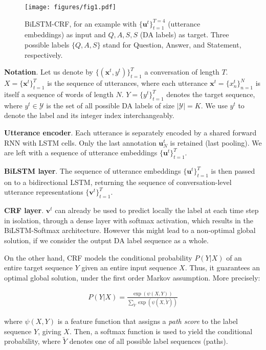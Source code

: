 \documentclass[11pt,a4paper]{article}
\begin{document}
\begin{figure}[t]
\centering
\texttt{[image: figures/fig1.pdf]}
\caption{
BiLSTM-CRF, for an example with $\{\mathbf{u}^t\}_{t=1}^{T=4}$ (utterance embeddings) as input and $Q,A,S,S$ (DA labels) as target. Three possible labels $\{Q,A,S\}$ stand for Question, Answer, and Statement, respectively.
}
\label{fig:BiLSTM-CRF}
\end{figure}

\noindent\textbf{Notation}.
Let us denote by $\{(\mathbf{x}^t, y^t)\}_{t=1}^{T}$ a conversation of length $T$.  $X=\{\mathbf{x}^t\}_{t=1}^{T}$ is the sequence of utterances, where each utterance $\mathbf{x}^t=\{x_n^t\}_{n=1}^N$ is itself a sequence of words of length $N$.
$Y=\{y^t\}_{t=1}^{T}$ denotes the target sequence, where $y^t \in \mathcal{Y}$ is the set of all possible DA labels of size $|\mathcal{Y}|=K$.
We use $y^t$ to denote the label and its integer index interchangeably.

\noindent\textbf{Utterance encoder}.
Each utterance is separately encoded by a shared forward RNN with LSTM cells.
Only the last annotation $\mathbf{u}^t_N$ is retained (last pooling).
We are left with a sequence of utterance embeddings $\{\mathbf{u}^t\}_{t=1}^T$.


\noindent\textbf{BiLSTM layer}. 
The sequence of utterance embeddings $\{\mathbf{u}^t\}_{t=1}^T$ is then passed on to a bidirectional LSTM, returning the sequence of conversation-level utterance representations $\{\mathbf{v}^t\}_{t=1}^T$.

\noindent\textbf{CRF layer}.
$\mathbf{v}^t$ can already be used to predict locally the label at each time step in isolation, through a dense layer with softmax activation, which results in the BiLSTM-Softmax architecture.
However this might lead to a non-optimal global solution, if we consider the output DA label sequence as a whole.

On the other hand, CRF models the conditional probability $P(Y|X)$ of an entire target sequence $Y$ given an entire input sequence $X$.
Thus, it guarantees an optimal global solution, under the first order Markov assumption.
More precisely:

{\small
\setlength{\abovedisplayskip}{-3pt}
\setlength{\belowdisplayskip}{3pt}
\begin{align}
\label{eq:main}
    P(Y|X) = \frac{\exp(\psi(X,Y))}{\sum_{\tilde{Y}} \exp(\psi(X,\tilde{Y}))}
\end{align}
}

\noindent where $\psi(X,Y)$ is a feature function that assigns a \textit{path score} to the label sequence $Y$, giving $X$.
Then, a softmax function is used to yield the conditional probability, where $\tilde{Y}$ denotes one of all possible label sequences (paths).
\end{document}
